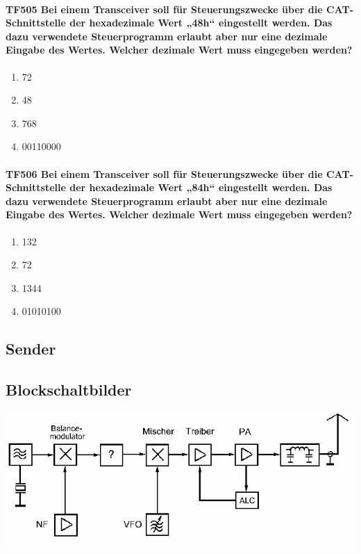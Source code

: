 \documentclass[8pt]{article}
\begin{document}
\paragraph*{TF505 Bei einem Transceiver soll für Steuerungszwecke über die CAT-Schnittstelle der hexadezimale Wert „48h“ eingestellt werden. Das dazu verwendete Steuerprogramm erlaubt aber nur eine dezimale Eingabe des Wertes. Welcher dezimale Wert muss eingegeben werden?}
\begin{enumerate}[nolistsep,label=\Alph*]
\item 72
\item 48
\item 768
\item 00110000
\end{enumerate}

\paragraph*{TF506 Bei einem Transceiver soll für Steuerungszwecke über die CAT-Schnittstelle der hexadezimale Wert „84h“ eingestellt werden. Das dazu verwendete Steuerprogramm erlaubt aber nur eine dezimale Eingabe des Wertes. Welcher dezimale Wert muss eingegeben werden?}
\begin{enumerate}[nolistsep,label=\Alph*]
\item 132
\item 72
\item 1344
\item 01010100
\end{enumerate}

\pagebreak
\subsection{Sender}
\subsection{Blockschaltbilder}
\begin{center}
	\begin{minipage}{\linewidth}
		\centering
		\includegraphics[scale=1.0]{pics/tg101_a.jpg}
	\end{minipage}
\end{center}
\end{document}
